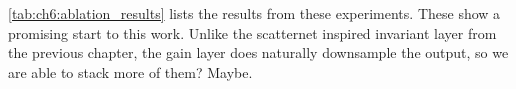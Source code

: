 \begin{figure}[t]
  \centering
  \label{fig:ch6:gl_results}
\end{figure}

\autoref{tab:ch6:ablation_results} lists the results from these experiments.
These show a promising start to this work. 
Unlike the scatternet inspired invariant layer from the previous chapter, the
gain layer does naturally downsample the output, so we are able to stack more of
them? Maybe.


